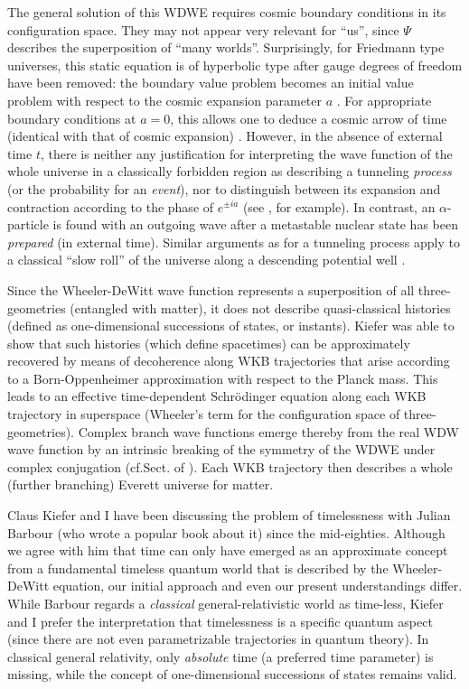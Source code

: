 The general solution of this WDWE requires cosmic boundary
conditions in its configuration space. They may not appear very
relevant for ``us'', since $\Psi$ describes the superposition of
``many worlds''. Surprisingly, for Friedmann type universes, this
static equation is of hyperbolic type after gauge degrees of freedom
have been removed: the boundary value problem becomes an initial value
problem with respect to the cosmic expansion parameter $a$ \cite{Z86}.
For appropriate boundary conditions at $a=0$, this allows one to deduce
a cosmic arrow of time (identical with that of cosmic expansion)
\cite{TD}. However, in the absence of external time $t$, there is
neither any justification for interpreting the wave function of the
whole universe in a classically forbidden region as describing a
tunneling {\it process} (or the probability for an {\it event}), nor
to distinguish between its expansion and contraction according to the
phase of $e^{\pm ia}$ (see
\cite{Vilenkin}, for example). In contrast, an
$\alpha$-particle is found with an outgoing wave after a metastable
nuclear state has been {\it prepared} (in external time). Similar
arguments as for a tunneling process apply to a classical ``slow
roll'' of the universe along a descending potential well
\cite{ST}.

Since the Wheeler-DeWitt wave function represents a superposition of
all three-geometries (entangled with matter), it does not
describe quasi-classical histories (defined as
one-dimensional successions of states, or instants). Kiefer was able
to show \cite{Kiefer} that such histories (which define spacetimes)
can be approximately recovered by means of decoherence along WKB
trajectories that arise according to a Born-Oppen\-heimer
approximation with respect to the Planck mass. This leads to an
effective time-dependent Schr\"odinger equation along each WKB
trajectory in superspace (Wheeler's term for the configuration  space
of three-geo\-metries). Complex branch wave functions emerge thereby
from the real WDW wave function by an intrinsic breaking of the
symmetry  of the WDWE under complex conjugation (cf.\ts Sect.
of
\cite{Giulini}). Each WKB trajectory then describes a whole
(further branching) Everett universe for matter.

Claus Kiefer and I have been discussing the problem of timelessness
with Julian Barbour (who wrote a popular book \cite{Barbour} about it)
since the mid-eighties. Although we agree with him that time can only
have emerged as an approximate concept from a fundamental timeless
quantum world that is described by the Wheeler-DeWitt equation, our
initial approach and even our present understandings differ. While
Barbour regards a {\it classical} general-relativistic world as
time-less, Kiefer and I prefer the interpretation that timelessness is
a specific quantum aspect (since there are not even parametrizable
trajectories in quantum theory). In classical general relativity, only
{\it absolute} time (a preferred time parameter) is missing, while the
concept of one-dimensional successions of states remains valid.

